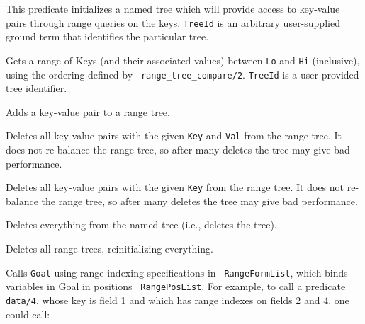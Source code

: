 \begin{description}

This predicate initializes a named tree which will provide access to
key-value pairs through range queries on the keys.  {\tt TreeId} is an
arbitrary user-supplied ground term that identifies the particular
tree.

Gets a range of Keys (and their associated values) between {\tt Lo}
and {\tt Hi} (inclusive), using the ordering defined by {\tt
  range\_tree\_compare/2}.  {\tt TreeId} is a user-provided tree
identifier.  

  Adds a key-value pair to a range tree.

Deletes all key-value pairs with the given {\tt Key} and {\tt Val}
from the range tree.  It does not re-balance the range tree, so after
many deletes the tree may give bad performance.

%
Deletes all key-value pairs with the given {\tt Key} from the range
tree.  It does not re-balance the range tree, so after many deletes
the tree may give bad performance.

Deletes everything from the named tree (i.e., deletes the tree).

Deletes all range trees, reinitializing everything.


  Calls {\tt Goal} using range indexing specifications in {\tt
    RangeFormList}, which binds variables in Goal in positions {\tt
    RangePosList}.  For example, to call a predicate {\tt data/4},
  whose key is field 1 and which has range indexes on fields 2 and 4,
  one could call:


\end{description}

